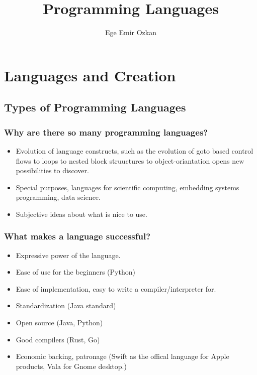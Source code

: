 \documentclass[11pt]{book}
\title{\textbf{Programming Languages}}
\author{Ege Emir Ozkan}
\date{}
\begin{document}
\maketitle

\chapter{Languages and Creation}

\section{Types of Programming Languages}

\subsection{Why are there so many programming languages?}

\begin{itemize}
	\item Evolution of language constructs, such as the evolution of goto based control flows to loops to nested block struuctures to object-oriantation opens new possibilities to discover.
	
	\item Special purposes, languages for scientific computing, embedding systems programming, data science.
	
	\item Subjective ideas about what is nice to use.
\end{itemize}


\subsection{What makes a language successful?}

\begin{itemize}
	\item Expressive power of the language.
	\item Ease of use for the beginners (Python)
	\item Ease of implementation, easy to write a compiler/interpreter for.
	\item Standardization (Java standard)
	\item Open source (Java, Python)
	\item Good compilers (Rust, Go)
	\item Economic backing, patronage (Swift as the offical language for Apple products, Vala for Gnome desktop.)
\end{itemize}
\end{document}
